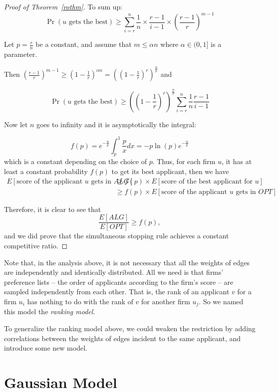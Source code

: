 \begin{proof}[Proof of Theorem~\ref{rothm}]
    To sum up:
    $$\Pr(u\text{ gets the best}) \ge \sum_{i=r}^{n} \frac{1}{n} \times \frac{r-1}{i-1} \times (\frac{r-1}{r})^{m-1}$$

    Let $p = \frac{r}{n}$ be a constant, and assume that $m \le \alpha n$ where $\alpha \in (0,1]$ is a parameter.

    Then $(\frac{r-1}{r})^{m-1} \ge (1-\frac{1}{r})^{\alpha n} = ((1-\frac{1}{r})^{r})^{\frac{\alpha}{p}}$ and

    $$\Pr(u \text{ gets the best}) \ge ((1 - \frac{1}{r})^r)^{\frac{\alpha}{p}} \sum_{i=r}^{n} \frac{1}{n}\frac{r-1}{i-1}$$

    Now let $n$ goes to infinity and it is asymptotically the integral:

    $$f(p) = e^{-\frac{\alpha}{p}} \int_{p}^{1} \frac{p}{x} dx = -p \ln(p) e^{-\frac{\alpha}{p}}$$
    which is a constant depending on the choice of $p$.
    Thus, for each firm $u$, it
    has at least a constant probability $f(p)$ to get its best applicant, then we have
    \begin{align*}
        E[\text{score of the applicant }u\text{ gets in }ALG]
        & \ge f(p) \times E[\text{score of the best applicant for }u] \\
        & \ge f(p) \times E[\text{score of the applicant }u\text{ gets in }OPT]
    \end{align*}

    Therefore, it is clear to see that
    \[ \frac{E[ALG]}{E[OPT]} \ge f(p), \]
    and we did prove that the simultaneous stopping rule
    achieves a constant competitive ratio.
\end{proof}

Note that, in the analysis above, it is not necessary that all the weights
of edges are independently and identically distributed.
All we need is that firms' preference lists -- the order of applicants
according to the firm's score -- are sampled independently from each other.
That is, the rank of an applicant $v$ for a firm $u_i$ has nothing to do
with the rank of $v$ for another firm $u_j$.
So we named this model the \emph{ranking model}.

To generalize the ranking model above, we could weaken the restriction by
adding correlations between the weights of edges incident to
the same applicant, and introduce some new model.

\section{Gaussian Model}

